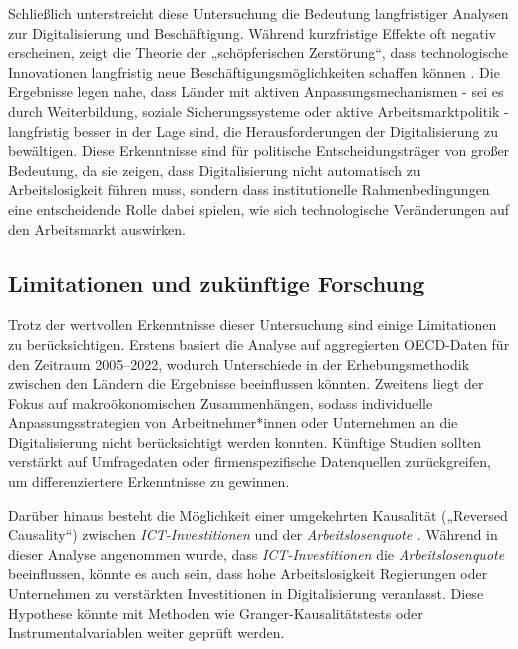 Schließlich unterstreicht diese Untersuchung die Bedeutung langfristiger Analysen zur 
Digitalisierung und Beschäftigung. Während kurzfristige Effekte oft negativ erscheinen, 
zeigt die Theorie der „schöpferischen Zerstörung“, dass technologische Innovationen 
langfristig neue Beschäftigungsmöglichkeiten schaffen können 
\parencite[vgl.][S. 81–86]{schumpeter1976capitalism}. Die Ergebnisse legen nahe, dass 
Länder mit aktiven Anpassungsmechanismen - sei es durch Weiterbildung, soziale 
Sicherungssysteme oder aktive Arbeitsmarktpolitik - langfristig besser in der Lage sind, 
die Herausforderungen der Digitalisierung zu bewältigen. Diese Erkenntnisse sind für 
politische Entscheidungsträger von großer Bedeutung, da sie zeigen, dass Digitalisierung 
nicht automatisch zu Arbeitslosigkeit führen muss, sondern dass institutionelle 
Rahmenbedingungen eine entscheidende Rolle dabei spielen, wie sich technologische 
Veränderungen auf den Arbeitsmarkt auswirken.


\subsection{Limitationen und zukünftige Forschung}

Trotz der wertvollen Erkenntnisse dieser Untersuchung sind einige Limitationen zu 
berücksichtigen. Erstens basiert die Analyse auf aggregierten \ac{OECD}-Daten für den 
Zeitraum 2005–2022, wodurch Unterschiede in der Erhebungsmethodik zwischen den Ländern 
die Ergebnisse beeinflussen könnten. Zweitens liegt der Fokus auf makroökonomischen 
Zusammenhängen, sodass individuelle Anpassungsstrategien von Arbeitnehmer*innen oder 
Unternehmen an die Digitalisierung nicht berücksichtigt werden konnten. Künftige Studien 
sollten verstärkt auf Umfragedaten oder firmenspezifische Datenquellen zurückgreifen, um 
differenziertere Erkenntnisse zu gewinnen.

Darüber hinaus besteht die Möglichkeit einer umgekehrten Kausalität („Reversed Causality“) 
zwischen \textit{\ac{ICT}-Investitionen} und der \textit{Arbeitslosenquote} 
\parencite[S. 29–33]{pearl2009causality}. Während in dieser Analyse angenommen wurde, dass 
\textit{\ac{ICT}-Investitionen} die \textit{Arbeitslosenquote} beeinflussen, könnte es 
auch sein, dass hohe Arbeitslosigkeit Regierungen oder Unternehmen zu verstärkten 
Investitionen in Digitalisierung veranlasst. Diese Hypothese könnte mit Methoden wie 
Granger-Kausalitätstests oder Instrumentalvariablen weiter geprüft werden.


